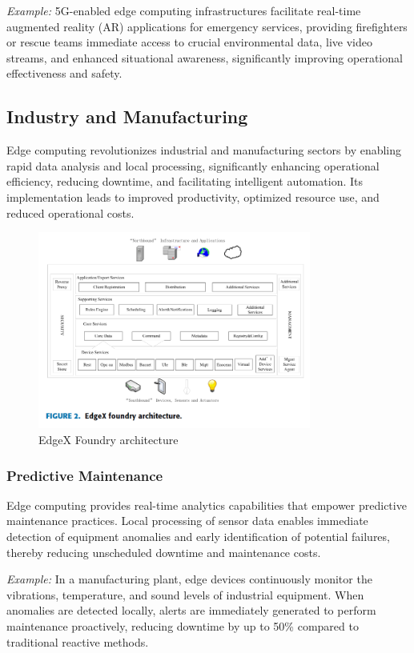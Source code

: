 \documentclass[runningheads]{llncs}
\begin{document}
\textit{Example:} 5G-enabled edge computing infrastructures facilitate real-time augmented reality (AR) applications for emergency services, providing firefighters or rescue teams immediate access to crucial environmental data, live video streams, and enhanced situational awareness, significantly improving operational effectiveness and safety.


\subsection{Industry and Manufacturing}

Edge computing revolutionizes industrial and manufacturing sectors by enabling rapid data analysis and local processing, significantly enhancing operational efficiency, reducing downtime, and facilitating intelligent automation. Its implementation leads to improved productivity, optimized resource use, and reduced operational costs.

\begin{figure}[ht]
    \centering
    \includegraphics[width=0.8\textwidth]{IMG/7.png}
    \caption{EdgeX Foundry architecture}
    \label{fig:edgex_architecture}
    \end{figure}

\subsubsection{Predictive Maintenance}
Edge computing provides real-time analytics capabilities that empower predictive maintenance practices. Local processing of sensor data enables immediate detection of equipment anomalies and early identification of potential failures, thereby reducing unscheduled downtime and maintenance costs.

\textit{Example:} In a manufacturing plant, edge devices continuously monitor the vibrations, temperature, and sound levels of industrial equipment. When anomalies are detected locally, alerts are immediately generated to perform maintenance proactively, reducing downtime by up to 50\% compared to traditional reactive methods.
\end{document}
